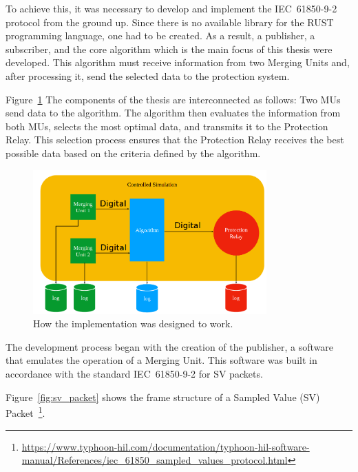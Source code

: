 To achieve this, it was necessary to develop and implement the IEC~61850-9-2 protocol from the ground up. Since there is no available library for the RUST programming language, one had to be created. As a result, a publisher, a subscriber, and the core algorithm which is the main focus of this thesis were developed. This algorithm must receive information from two Merging Units and, after processing it, send the selected data to the protection system.

Figure~\ref{fig:overview_of_implementation} The components of the thesis are interconnected as follows: Two MUs send data to the algorithm. The algorithm then evaluates the information from both MUs, selects the most optimal data, and transmits it to the Protection Relay. This selection process ensures that the Protection Relay receives the best possible data based on the criteria defined by the algorithm.

\begin{figure}[tbh!]
	\centering
	\includegraphics[width=0.80\textwidth, keepaspectratio]{ch4/assets/Implementation.png} %
	\caption{How the implementation was designed to work.}
	\label{fig:overview_of_implementation}
\end{figure}

The development process began with the creation of the publisher, a software that emulates the operation of a Merging Unit. This software was built in accordance with the standard IEC~61850-9-2 for SV packets.

Figure~\ref{fig:sv_packet} shows the frame structure of a Sampled Value (SV) Packet~\footnote{\url{https://www.typhoon-hil.com/documentation/typhoon-hil-software-manual/References/iec_61850_sampled_values_protocol.html}}.

